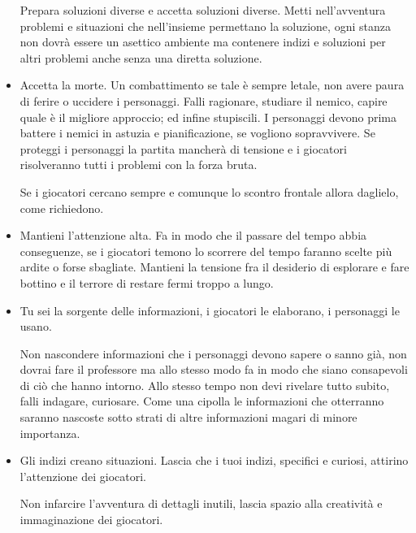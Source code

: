 \begin{multicols}{2}
\begin{itemize}[leftmargin=*]
Prepara soluzioni diverse e accetta soluzioni diverse. Metti nell'avventura problemi e situazioni che nell'insieme permettano la soluzione, ogni stanza non dovrà essere un asettico ambiente ma contenere indizi e soluzioni per altri problemi anche senza una diretta soluzione.

\item
Accetta la morte. Un combattimento se tale è sempre letale, non avere paura di ferire o uccidere i personaggi. Falli ragionare, studiare il nemico, capire quale è il migliore approccio; ed infine stupiscili. I personaggi devono prima battere i nemici in astuzia e pianificazione, se vogliono sopravvivere.
Se proteggi i personaggi la partita mancherà di tensione e i giocatori risolveranno tutti i problemi con la forza bruta.

Se i giocatori cercano sempre e comunque lo scontro frontale allora daglielo, come richiedono.

\item
Mantieni l'attenzione alta. Fa in modo che il passare del tempo abbia conseguenze, se i giocatori temono lo scorrere del tempo faranno scelte più ardite o forse sbagliate. Mantieni la tensione fra il desiderio di esplorare e fare bottino e il terrore di restare fermi troppo a lungo.

\item
Tu sei la sorgente delle informazioni, i giocatori le elaborano, i personaggi le usano.

Non nascondere informazioni che i personaggi devono sapere o sanno già, non dovrai fare il professore ma allo stesso modo fa in modo che siano consapevoli di ciò che hanno intorno.
Allo stesso tempo non devi rivelare tutto subito, falli indagare, curiosare. Come una cipolla le informazioni che otterranno saranno nascoste sotto strati di altre informazioni magari di minore importanza.

\item
Gli indizi creano situazioni. Lascia che i tuoi indizi, specifici e curiosi, attirino l'attenzione dei giocatori.%

Non infarcire l'avventura di dettagli inutili, lascia spazio alla creatività e immaginazione dei giocatori. %


\end{itemize}
\end{multicols}

